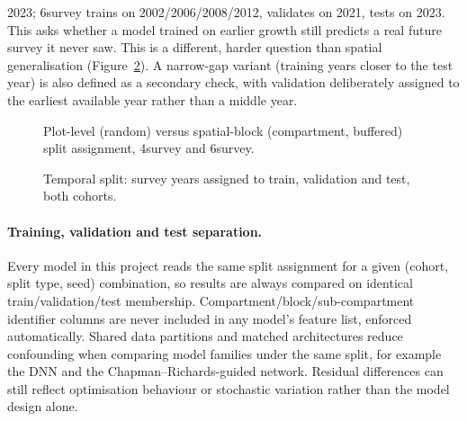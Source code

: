 \documentclass[11pt,a4paper]{report}
\begin{document}
\begin{itemize}
  2023; 6survey trains on 2002/2006/2008/2012, validates on 2021, tests on 2023. This asks whether
  a model trained on earlier growth still predicts a real future survey it never saw. This is a
  different, harder question than spatial generalisation (Figure~\ref{fig:temporal-split}). A
  narrow-gap variant (training years closer to the test year) is also defined as a secondary
  check, with validation deliberately assigned to the earliest available year rather than a
  middle year.
\end{itemize}

\begin{figure}[!htbp]
\centering
{}
\caption{Plot-level (random) versus spatial-block (compartment, buffered) split assignment,
4survey and 6survey.}
\label{fig:split-maps}
\end{figure}

\begin{figure}[!htbp]
\centering
{}
\caption{Temporal split: survey years assigned to train, validation and test, both cohorts.}
\label{fig:temporal-split}
\end{figure}

\paragraph*{Training, validation and test separation.}
Every model in this project reads the same split assignment for a given (cohort, split type,
seed) combination, so results are always compared on identical train/validation/test membership.
Compartment/block/sub-compartment identifier columns are never included in any model's feature
list, enforced automatically. Shared data partitions and matched architectures reduce confounding
when comparing model families under the same split, for example the DNN and the
Chapman--Richards-guided network. Residual differences can still reflect optimisation behaviour or
stochastic variation rather than the model design alone.
\end{document}
